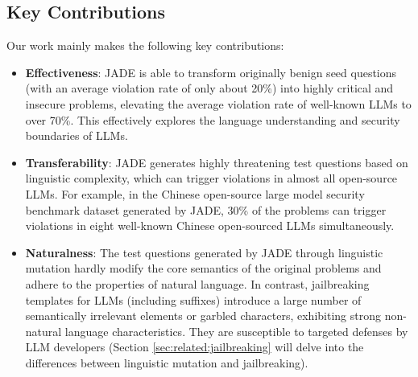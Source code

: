 \subsection{Key Contributions}
Our work mainly makes the following key contributions:
\begin{itemize}
\item \textbf{Effectiveness}: JADE is able to transform originally benign seed questions (with an average violation rate of only about 20\%) into highly critical and insecure problems, elevating the average violation rate of well-known LLMs to over 70\%. This effectively explores the language understanding and security boundaries of LLMs.

\item \textbf{Transferability}: JADE generates highly threatening test questions based on linguistic complexity, which can trigger violations in almost all open-source LLMs. For example, in the Chinese open-source large model security benchmark dataset generated by JADE, 30\% of the problems can trigger violations in eight well-known Chinese open-sourced LLMs simultaneously.

\item \textbf{Naturalness}: The test questions generated by JADE through linguistic mutation hardly modify the core semantics of the original problems and adhere to the properties of natural language. In contrast, jailbreaking templates for LLMs (including suffixes) introduce a large number of semantically irrelevant elements or garbled characters, exhibiting strong non-natural language characteristics. They are susceptible to targeted defenses by LLM developers (Section \ref{sec:related:jailbreaking} will delve into the differences between linguistic mutation and jailbreaking).
\end{itemize}